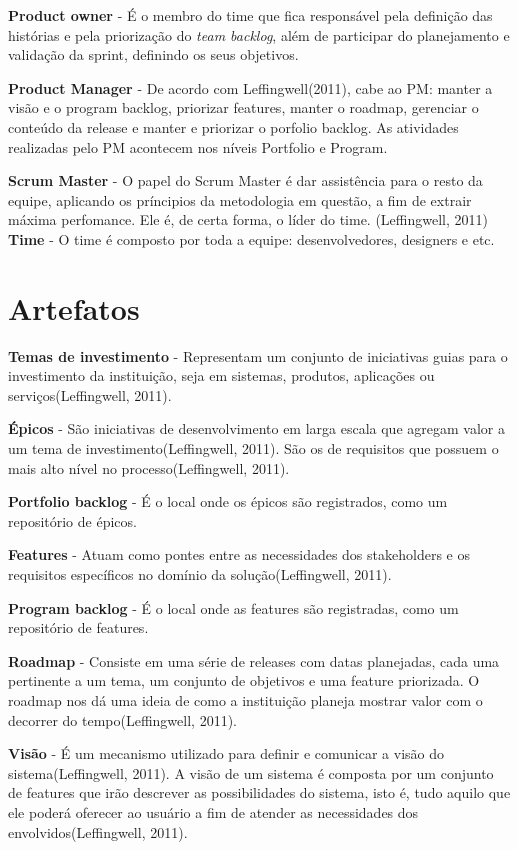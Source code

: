 \textbf{Product owner} - É o membro do time que fica responsável pela definição das histórias e pela priorização do 
\textit{team backlog}, além de participar do planejamento e validação da sprint, definindo os seus objetivos.

\textbf{Product Manager} - De acordo com Leffingwell(2011), cabe ao PM: manter a visão e o program backlog, priorizar features, manter o roadmap, gerenciar o conteúdo da release e manter e priorizar o porfolio backlog. As atividades realizadas pelo PM acontecem nos níveis Portfolio e Program.

\textbf{Scrum Master} - O papel do Scrum Master é dar assistência para o resto da equipe, aplicando os príncipios da metodologia em questão, a fim de extrair máxima perfomance. Ele é, de certa forma, o líder do time. (Leffingwell, 2011)
\textbf{Time} - O time é composto por toda a equipe: desenvolvedores, designers e etc.
\section{Artefatos}
\textbf{Temas de investimento} - Representam um conjunto de iniciativas guias para o investimento da instituição, seja em sistemas, produtos, aplicações ou serviços(Leffingwell, 2011).

\textbf{Épicos} - São iniciativas de desenvolvimento em larga escala que agregam valor a um tema de investimento(Leffingwell, 2011). São os de requisitos que possuem o mais alto nível no processo(Leffingwell, 2011).

\textbf{Portfolio backlog} - É o local onde os épicos são registrados, como um repositório de épicos.

\textbf{Features} - Atuam como pontes entre as necessidades dos stakeholders e os requisitos específicos no domínio da solução(Leffingwell, 2011).

\textbf{Program backlog} - É o local onde as features são registradas, como um repositório de features.

\textbf{Roadmap} - Consiste em uma série de releases com datas planejadas, cada uma pertinente a um tema, um conjunto de objetivos e uma feature priorizada. O roadmap nos dá uma ideia de como a instituição planeja mostrar valor com o decorrer do tempo(Leffingwell, 2011).

\textbf{Visão} - É um mecanismo utilizado para definir e comunicar a visão do sistema(Leffingwell, 2011). A visão de um sistema é composta por um conjunto de features que irão descrever as possibilidades do sistema, isto é, tudo aquilo que ele poderá oferecer ao usuário a fim de atender as necessidades dos envolvidos(Leffingwell, 2011).

